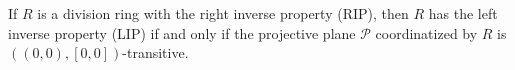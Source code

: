 If $R$ is a division ring with the right inverse property (RIP), then $R$ has the left inverse property (LIP) if and only if the projective plane $\mathcal{P}$ coordinatized by $R$ is $((0,0), [0,0])$-transitive.
